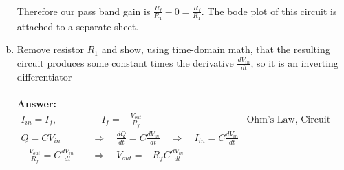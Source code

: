 \documentclass[12pt, a4paper]{article}
\begin{document}
\begin{enumerate}[(a)]
\begin{align*}
\end{align*}
Therefore our pass band gain is $\frac{R_f}{R_1} - 0 = \frac{R_f}{R_1}$. The bode plot of this circuit is attached to a separate sheet.
\item Remove resistor $R_1$ and show, using time-domain math, that the resulting circuit
produces some constant times the derivative $\frac{dV_{in}}{dt}$, so it is an inverting differentiator \\ \\
\textbf{Answer: } \\
\begin{align*}
I_{in} = I_{f}, &\quad I_f = -\frac{V_{out}}{R_f} &\text{Ohm's Law, Circuit Fact} \\
Q = C V_{in} \quad &\Rightarrow \quad \frac{dQ}{dt} = C \frac{d V_{in}}{dt} \quad \Rightarrow \quad I_{in} = C \frac{dV_{in}}{dt} \\
-\frac{V_{out}}{R_f} = C \frac{dV_{in}}{dt} \quad &\Rightarrow \quad V_{out} = -R_f C \frac{dV_{in}}{dt}
\end{align*}
\end{enumerate}
\end{document}
